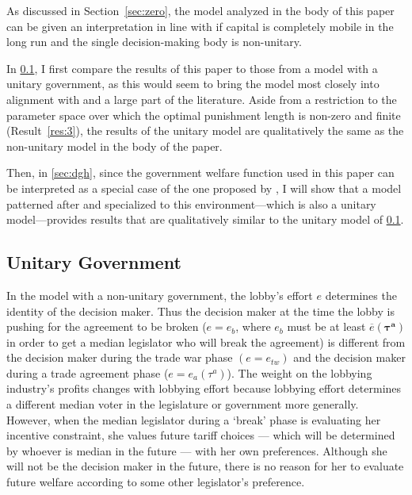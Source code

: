 \documentclass[authoryear, review]{elsarticle}
\newcommand{\ov}{\overline}
\newcommand{\bta}{\bm{\tau^a}}
\begin{document}
As discussed in Section~\ref{sec:zero}, the model analyzed in the body of this paper can be given an interpretation in line with \citet{mrc2007} if capital is completely mobile in the long run and the single decision-making body is non-unitary.

In \ref{sec:unitary}, I first compare the results of this paper to those from a model with a unitary government, as this would seem to bring the model most closely into alignment with \citet{mrc2007} and a large part of the literature. Aside from a restriction to the parameter space over which the optimal punishment length is non-zero and finite (Result~\ref{res:3}), the results of the unitary model are qualitatively the same as the non-unitary model in the body of the paper.

Then, in \ref{sec:dgh}, since the government welfare function used in this paper can be interpreted as a special case of the one proposed by \citet{dgh97}, I will show that a model patterned after \citet{dgh97} and specialized to this environment---which is also a unitary model---provides results that are qualitatively similar to the unitary model of \ref{sec:unitary}.

\subsection{Unitary Government}
\label{sec:unitary}
In the model with a non-unitary government, the lobby's effort $e$ determines the identity of the decision maker. Thus the decision maker at the time the lobby is pushing for the agreement to be broken ($e=e_b$, where $e_b$ must be at least $\ov{e}(\bta)$ in order to get a median legislator who will break the agreement) is different from the decision maker during the trade war phase $(e = e_{tw})$ and the decision maker during a trade agreement phase ($e=e_a(\tau^a)$). The weight on the lobbying industry's profits changes with lobbying effort because lobbying effort determines a different median voter in the legislature or government more generally. However, when the median legislator during a `break' phase is evaluating her incentive constraint, she values future tariff choices --- which will be determined by whoever is median in the future --- with her own preferences. Although she will not be the decision maker in the future, there is no reason for her to evaluate future welfare according to some other legislator's preference.
\end{document}
